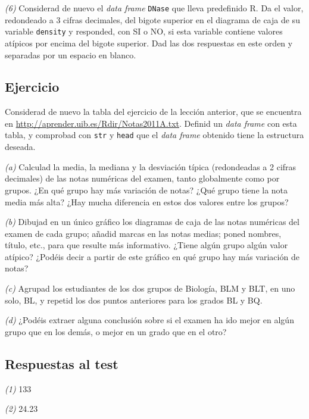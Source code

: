 \documentclass[
]{book}
\theoremstyle{definition}
\theoremstyle{definition}
\theoremstyle{definition}
\theoremstyle{remark}
\begin{document}
\emph{(6)} Considerad de nuevo el \emph{data frame} \texttt{DNase} que lleva predefinido R. Da el valor, redondeado a 3 cifras decimales, del bigote superior en el diagrama de caja de su variable \texttt{density} y responded, con SI o NO, si esta variable contiene valores atípicos por encima del bigote superior. Dad las dos respuestas en este orden y separadas por un espacio en blanco.

\hypertarget{ejercicio-9}{%
\subsection*{Ejercicio}\label{ejercicio-9}}

Considerad de nuevo la tabla del ejercicio de la lección anterior, que se encuentra en \url{http://aprender.uib.es/Rdir/Notas2011A.txt}.
Definid un \emph{data frame} con esta tabla, y comprobad con \texttt{str} y \texttt{head} que el \emph{data frame} obtenido tiene la estructura deseada.

\emph{(a)} Calculad la media, la mediana y la desviación típica (redondeadas a 2 cifras decimales) de las notas numéricas del examen, tanto globalmente como por grupos. ¿En qué grupo hay más variación de notas? ¿Qué grupo tiene la nota media más alta? ¿Hay mucha diferencia en estos dos valores entre los grupos?

\emph{(b)} Dibujad en un único gráfico los diagramas de caja de las notas numéricas del examen de cada grupo; añadid marcas en las notas medias; poned nombres, título, etc., para que resulte más informativo. ¿Tiene algún grupo algún valor atípico? ¿Podéis decir a partir de este gráfico en qué grupo hay más variación de notas?

\emph{(c)} Agrupad los estudiantes de los dos grupos de Biología, BLM y BLT, en uno solo, BL, y repetid los dos puntos anteriores para los grados BL y BQ.

\emph{(d)} ¿Podéis extraer alguna conclusión sobre si el examen ha ido mejor en algún grupo que en los demás, o mejor en un grado que en el otro?

\hypertarget{respuestas-al-test-9}{%
\subsection*{Respuestas al test}\label{respuestas-al-test-9}}

\emph{(1)} 133

\emph{(2)} 24.23
\end{document}
